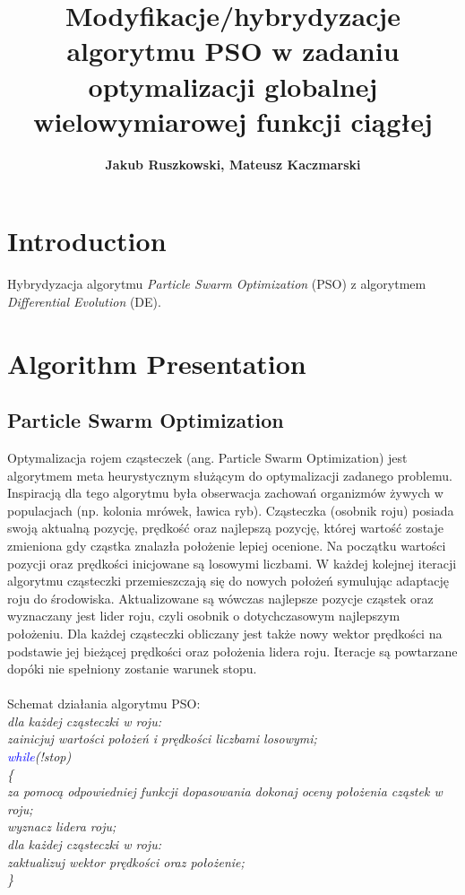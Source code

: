 \documentclass{article}
\title{Modyfikacje/hybrydyzacje algorytmu PSO w zadaniu optymalizacji globalnej wielowymiarowej funkcji ciągłej}
\author{
\textbf{Jakub Ruszkowski, Mateusz Kaczmarski}\\
	}
\begin{document}
\maketitle

 \section{Introduction}
Hybrydyzacja algorytmu \textit{Particle Swarm Optimization} (PSO) z algorytmem \textit{Differential Evolution} (DE).
 \section{Algorithm Presentation}
 \subsection{Particle Swarm Optimization}
 Optymalizacja rojem cząsteczek (ang. Particle Swarm Optimization) jest algorytmem meta heurystycznym służącym do optymalizacji zadanego problemu. Inspiracją dla tego algorytmu była obserwacja zachowań organizmów żywych w populacjach (np. kolonia mrówek, ławica ryb). Cząsteczka (osobnik roju) posiada swoją aktualną pozycję, prędkość oraz najlepszą pozycję, której wartość zostaje zmieniona gdy cząstka znalazła położenie lepiej ocenione. Na początku wartości pozycji oraz prędkości inicjowane są losowymi liczbami. W każdej kolejnej iteracji algorytmu cząsteczki przemieszczają się do nowych położeń symulując adaptację roju do środowiska. Aktualizowane są wówczas najlepsze pozycje cząstek oraz wyznaczany jest lider roju, czyli osobnik o dotychczasowym najlepszym położeniu. Dla każdej cząsteczki obliczany jest także nowy wektor prędkości na podstawie jej bieżącej prędkości oraz położenia lidera roju. Iteracje są powtarzane dopóki nie spełniony zostanie warunek stopu.\\\\
 Schemat działania algorytmu PSO:\\
 \textit{
\indent dla każdej cząsteczki w roju:\\
\indent \indent zainicjuj wartości położeń i prędkości liczbami losowymi;\\
\indent \textcolor{blue}{while}(!stop)\\
\indent \{\\
\indent \indent za pomocą odpowiedniej funkcji dopasowania dokonaj oceny położenia cząstek w roju;\\
\indent \indent wyznacz lidera roju;\\
\indent \indent dla każdej cząsteczki w roju:\\
\indent \indent \indent zaktualizuj wektor prędkości oraz położenie;\\
\indent \}\\
 }
 
\end{document}
